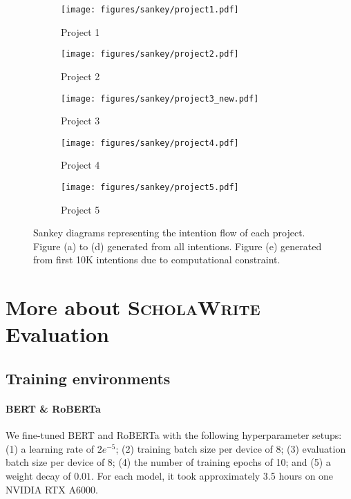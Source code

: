\begin{figure*}
    \centering
    \begin{subfigure}{0.32\textwidth}
        \texttt{[image: figures/sankey/project1.pdf]}
        \caption{Project 1}
    \end{subfigure}
    \begin{subfigure}{0.32\textwidth}
        \texttt{[image: figures/sankey/project2.pdf]}
        \caption{Project 2}
    \end{subfigure}
    \begin{subfigure}{0.32\textwidth}
        \texttt{[image: figures/sankey/project3\_new.pdf]}
        \caption{Project 3}
    \end{subfigure}
    \begin{subfigure}{0.32\textwidth}
        \texttt{[image: figures/sankey/project4.pdf]}
        \caption{Project 4}
    \end{subfigure}
    \begin{subfigure}{0.32\textwidth}
        \texttt{[image: figures/sankey/project5.pdf]}
        \caption{Project 5}
    \end{subfigure}
    \caption{Sankey diagrams representing the intention flow of each project. Figure (a) to (d) generated from all intentions. Figure (e) generated from first 10K intentions due to computational constraint.}
    \label{fig:writing-sankey-all}
\end{figure*}



\section{More about \textsc{ScholaWrite} Evaluation}\label{sec:appendix:model}

\subsection{Training environments}

\paragraph{BERT \& RoBERTa} We fine-tuned BERT and RoBERTa with the following hyperparameter setups: (1) a learning rate of $2e^{-5}$; (2) training batch size per device of 8; (3) evaluation batch size per device of 8; (4) the number of training epochs of 10; and (5) a weight decay of $0.01$. For each model, it took approximately 3.5 hours on one NVIDIA RTX A6000. 

